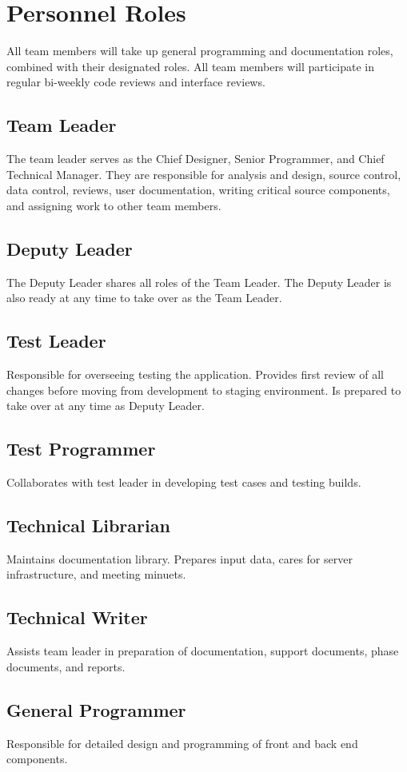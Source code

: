 \documentclass[]{article}
\begin{document}
\section{Personnel Roles}
All team members will take up general programming and documentation roles, combined with their designated roles. All team members will participate in regular bi-weekly code reviews and interface reviews.
\subsection{Team Leader}
The team leader serves as the Chief Designer, Senior Programmer, and Chief Technical Manager. They are responsible for analysis and design, source control, data control, reviews, user documentation, writing critical source components, and assigning work to other team members.
\subsection{Deputy Leader}
The Deputy Leader shares all roles of the Team Leader. The Deputy Leader is also ready at any time to take  over as the Team  Leader.
\subsection{Test Leader}
Responsible for overseeing testing the application. Provides first review of all changes before moving from development to staging environment. Is prepared to take over at any time as Deputy Leader.
\subsection{Test Programmer}
Collaborates with test leader in developing test cases and testing builds.
\subsection{Technical Librarian}
Maintains documentation library. Prepares input data, cares for server infrastructure, and meeting minuets.
\subsection{Technical Writer}
Assists team leader in preparation of documentation, support documents, phase documents, and reports.
\subsection{General Programmer}
Responsible for detailed design and programming of front and back end components.
\end{document}
